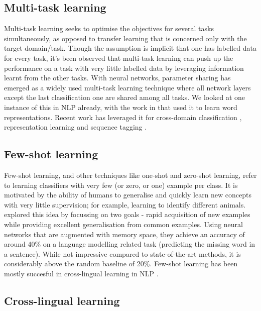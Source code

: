 \documentclass[12pt]{report}
\begin{document}
	\subsection{Multi-task learning}
	Multi-task learning \citep{caruna1993multitask} seeks to optimise the objectives for several tasks simultaneously, as opposed to transfer learning that is concerned only with the target domain/task. Though the assumption is implicit that one has labelled data for every task, it's been observed that multi-task learning can push up the performance on a task with very little labelled data by leveraging information learnt from the other tasks. With neural networks, parameter sharing has emerged as a widely used multi-task learning technique where all network layers except the last classification one are shared among all tasks. We looked at one instance of this in NLP already, with the work in \citep{collobert2008unified} that used it to learn word representations. Recent work has leveraged it for cross-domain classification \citep{yu2016learning} \citep{liu2015representation}, representation learning \citep{hashimoto2016joint} and sequence tagging \citep{sogaard2016deep} \citep{rei2017semi}.
	
	\subsection{Few-shot learning}
	Few-shot learning, and other techniques like one-shot and zero-shot learning, refer to learning classifiers with very few (or zero, or one) example per class. It is motivated by the ability of humans to generalise and quickly learn new concepts with very little supervision; for example, learning to identify different animals. \citep{vinyals2016matching} explored this idea by focussing on two goals - rapid acquisition of new examples while providing excellent generalisation from common examples. Using neural networks that are augmented with memory space, they achieve an accuracy of around 40\% on a language modelling related task (predicting the missing word in a sentence). While not impressive compared to state-of-the-art methods, it is considerably above the random baseline of 20\%. Few-shot learning has been mostly succesful in cross-lingual learning in NLP  \citep{artetxe2018massively} \citep{upadhyay2018almost}.
	
	\subsection{Cross-lingual learning}
	
\end{document}
